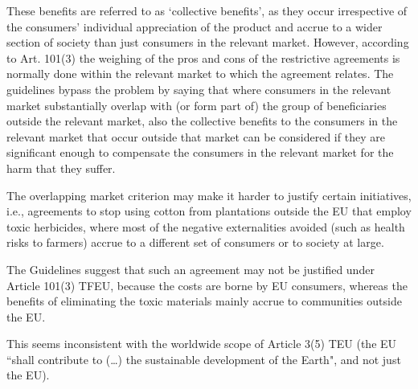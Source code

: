             
            These benefits are referred to as `collective benefits', as they occur irrespective of the consumers’ individual appreciation of the product and accrue to a wider section of society than just consumers in the relevant market.  
            However, according to Art. 101(3) the weighing of the pros and cons of the restrictive agreements is normally done within the relevant market to which the agreement relates.  
            The guidelines bypass the problem by saying that where consumers in the relevant market substantially overlap with (or form part of) the group of beneficiaries outside the relevant market, also the collective benefits to the consumers in the relevant market that occur outside that market can be considered if they are significant enough to compensate the consumers in the relevant market for the harm that they suffer.

            
            The overlapping market criterion may make it harder to justify certain initiatives, i.e., agreements to stop using cotton from plantations outside the EU that employ toxic herbicides, where most of the negative externalities avoided (such as health risks to farmers) accrue to a different set of consumers or to society at large.
            
            The Guidelines suggest that such an agreement may not be justified under Article 101(3) TFEU, because the costs are borne by EU consumers, whereas the benefits of eliminating the toxic materials mainly accrue to communities outside the EU.
            
            This seems inconsistent with the worldwide scope of Article 3(5) TEU (the EU ``shall contribute to (…) the sustainable development of the Earth", and not just the EU).











